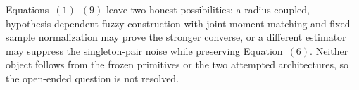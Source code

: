 Equations~\((1)\)--\((9)\) leave two honest possibilities: a radius-coupled, hypothesis-dependent fuzzy construction with joint moment matching and fixed-sample normalization may prove the stronger converse, or a different estimator may suppress the singleton-pair noise while preserving Equation~\((6)\).  Neither object follows from the frozen primitives or the two attempted architectures, so the open-ended question is not resolved.